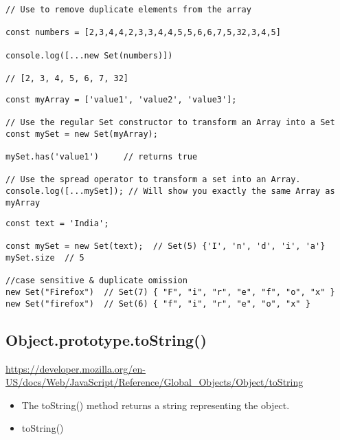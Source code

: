 \documentclass[10pt]{article}
\begin{document}
\begin{lstlisting}[title=Example remove duplicate elements from array, captionpos=t]
// Use to remove duplicate elements from the array

const numbers = [2,3,4,4,2,3,3,4,4,5,5,6,6,7,5,32,3,4,5]

console.log([...new Set(numbers)])

// [2, 3, 4, 5, 6, 7, 32]
\end{lstlisting}


\begin{lstlisting}[title=Example relationship with array, captionpos=t]
const myArray = ['value1', 'value2', 'value3'];

// Use the regular Set constructor to transform an Array into a Set
const mySet = new Set(myArray);

mySet.has('value1')     // returns true

// Use the spread operator to transform a set into an Array.
console.log([...mySet]); // Will show you exactly the same Array as myArray
\end{lstlisting}



\begin{lstlisting}[title=Example relationship with string, captionpos=t]
const text = 'India';

const mySet = new Set(text);  // Set(5) {'I', 'n', 'd', 'i', 'a'}
mySet.size  // 5

//case sensitive & duplicate omission
new Set("Firefox")  // Set(7) { "F", "i", "r", "e", "f", "o", "x" }
new Set("firefox")  // Set(6) { "f", "i", "r", "e", "o", "x" }
\end{lstlisting}

\medskip %






\medskip %
\pagebreak
\subsection{Object.prototype.toString()}

\url{https://developer.mozilla.org/en-US/docs/Web/JavaScript/Reference/Global_Objects/Object/toString}

\begin{itemize}
	\item The toString() method returns a string representing the object.
	\item toString()
\end{itemize}
\end{document}

